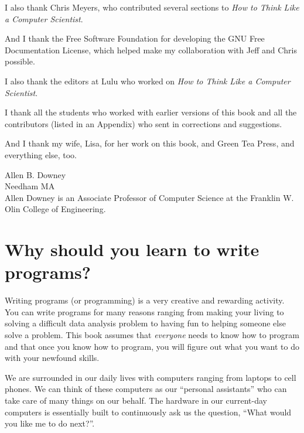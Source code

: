 \documentclass[10pt]{book}
\begin{document}
I also thank Chris Meyers, who contributed several sections
to {\em How to Think Like a Computer Scientist}.

And I thank the Free Software Foundation for developing
the GNU Free Documentation License, which helped make
my collaboration with Jeff and Chris possible.


I also thank the editors at Lulu who worked on
{\em How to Think Like a Computer Scientist}.

I thank all the students who worked with earlier
versions of this book and all the contributors (listed
in an Appendix) who sent in corrections and suggestions.

And I thank my wife, Lisa, for her work on this book, and Green
Tea Press, and everything else, too.

Allen B. Downey \\
Needham MA\\

Allen Downey is an Associate Professor of Computer Science at 
the Franklin W. Olin College of Engineering.


\clearemptydoublepage

\begin{latexonly}

\tableofcontents

\clearemptydoublepage

\end{latexonly}

\mainmatter

\chapter{Why should you learn to write programs?}

Writing programs (or programming) is a very creative 
and rewarding activity.  You can write programs for 
many reasons ranging from making your living to solving
a difficult data analysis problem to having fun to helping
someone else solve a problem.  This book assumes that 
{\em everyone} needs to know how to program and that once 
you know how to program, you will figure out what you want 
to do with your newfound skills.  

We are surrounded in our daily lives with computers ranging 
from laptops to cell phones.  We can think of these computers
as our ``personal assistants'' who can take care of many things
on our behalf.  The hardware in our current-day computers 
is essentially built to continuously ask us the question, 
``What would you like me to do next?''.
\end{document}
